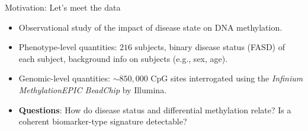 \documentclass[12pt,t]{beamer}
\begin{document}

\begin{frame}[c]{Motivation: Let's meet the data}

\begin{center}
\begin{itemize}
  \itemsep10pt
  \item Observational study of the impact of disease state on DNA methylation.
  \item Phenotype-level quantities: $216$ subjects, binary disease status (FASD)
    of each subject, background info on subjects (e.g., sex, age).
  \item Genomic-level quantities: $\sim 850,000$ CpG sites interrogated using
    the \textit{Infinium MethylationEPIC BeadChip} by Illumina.
  \item \textbf{Questions}: How do disease status and differential methylation
    relate? Is a coherent biomarker-type signature detectable?
\end{itemize}
\end{center}


\end{frame}

\end{document}

